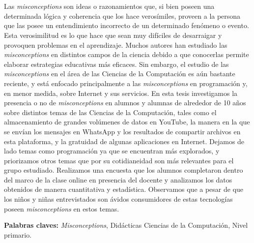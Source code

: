 \chapter*{\runtitulo}

\noindent Las \textit{misconceptions} son ideas o razonamientos que, si bien poseen una determinada lógica y coherencia que los hace verosímiles, proveen a la persona que las posee un entendimiento incorrecto de un determinado fenómeno o evento. Esta verosimilitud es lo que hace que sean muy difíciles de desarraigar y provoquen problemas en el aprendizaje. Muchos autores han estudiado las \textit{misconceptions} en distintos campos de la ciencia debido a que conocerlas permite elaborar estrategias educativas más eficaces. Sin embargo, el estudio de las \textit{misconceptions} en el área de las Ciencias de la Computación es aún bastante reciente, y está enfocado principalmente a las \textit{misconceptions} en programación y, en menor medida, sobre Internet y sus servicios. En esta tesis investigamos la presencia o no de \textit{misconceptions} en alumnos y alumnas de alrededor de 10 años sobre distintos temas de las Ciencias de la Computación, tales como el almacenamiento de grandes volúmenes de datos en YouTube, la manera en la que se envían los mensajes en WhatsApp y los resultados de compartir archivos en esta plataforma, y la gratuidad de algunas aplicaciones en Internet. Dejamos de lado temas como programación ya que se encuentran más explorados, y priorizamos otros temas que por su cotidianeidad son más relevantes para el grupo estudiado. Realizamos una encuesta que los alumnos completaron dentro del marco de la clase online en presencia del docente y analizamos los datos obtenidos de manera cuantitativa y estadística. 
Observamos que a pesar de que los niños y niñas entrevistados son ávidos consumidores de estas tecnologías poseen \textit{misconceptions} en estos temas.

\bigskip

\noindent\textbf{Palabras claves:} \textit{Misconceptions}, Didácticas Ciencias de la Computación, Nivel primario.